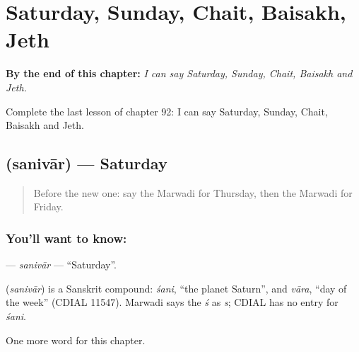 
\chapter{Saturday, Sunday, Chait, Baisakh, Jeth}
\label{ch:mw-saturday-sunday-chait-baisakh-jeth}

\begin{chapteropening}
\textbf{By the end of this chapter:} \emph{I can say Saturday, Sunday, Chait, Baisakh and Jeth.}

Complete the last lesson of chapter 92: I can say Saturday, Sunday, Chait, Baisakh and Jeth.
\end{chapteropening}

\section[\texorpdfstring{\mw{सनिवार} (sanivār)}{सनिवार (sanivār)}]{ (sanivār) — Saturday}

\label{lesson:MW-C92-sanivar}



\begin{quote}
Before the new one: say the Marwadi for Thursday, then the Marwadi for Friday.
\end{quote}

\subsection*{You'll want to know: }
\textbf{} — \emph{sanivār} — \textquotedblleft{}Saturday\textquotedblright{}.

\begin{cousinweb}
\textbf{} (\emph{sanivār}) is a Sanskrit compound: \emph{śani}, \textquotedblleft{}the planet Saturn\textquotedblright{}, and \emph{vāra}, \textquotedblleft{}day of the week\textquotedblright{} (CDIAL 11547). Marwadi says the \emph{ś} as \emph{s}; CDIAL has no entry for \emph{śani}.
\end{cousinweb}

\begin{grammarlens}[title={What you've built}]
One more word for this chapter.
\end{grammarlens}

